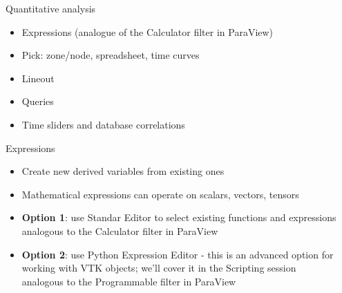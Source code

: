 \begin{frame}{Quantitative analysis}{}
  \begin{itemize}\setlength{\itemsep}{3mm}
  \item Expressions (analogue of the Calculator filter in ParaView)
  \item Pick: zone/node, spreadsheet, time curves
  \item Lineout
  \item Queries
  \item Time sliders and database correlations
  \end{itemize}
\end{frame}

\begin{frame}{Expressions}
  \begin{itemize}\setlength{\itemsep}{3mm}
  \item Create new derived variables from existing ones
  \item Mathematical expressions can operate on scalars, vectors, tensors
  \item {\bf Option 1}: use Standar Editor to select existing functions and expressions \\
    analogous to the Calculator filter in ParaView
  \item {\bf Option 2}: use Python Expression Editor - this is an advanced option for working
    with VTK objects; we'll cover it in the Scripting session \\ analogous to the Programmable
    filter in ParaView
  \end{itemize}
\end{frame}

